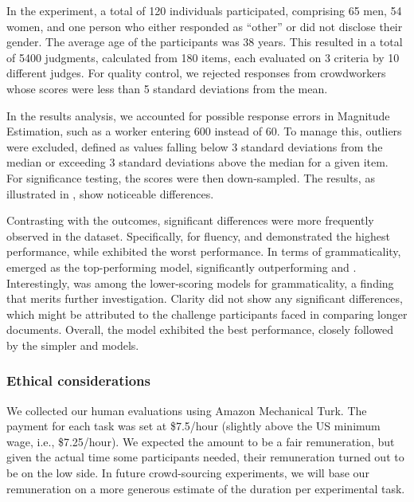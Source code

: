 In the experiment, a total of 120 individuals participated, comprising 65 men, 54 women, and one person who either responded as ``other'' or did not disclose their gender. The average age of the participants was 38 years. This resulted in a total of 5400 judgments, calculated from 180 items, each evaluated on 3 criteria by 10 different judges. For quality control, we rejected responses from crowdworkers whose scores were less than 5 standard deviations from the mean.


In the results analysis, we accounted for possible response errors in Magnitude Estimation, such as a worker entering 600 instead of 60. To manage this, outliers were excluded, defined as values falling below 3 standard deviations from the median or exceeding 3 standard deviations above the median for a given item. For significance testing, the scores were then down-sampled. The results, as illustrated in , show noticeable differences.



Contrasting with the \webnlg outcomes, significant differences were more frequently observed in the \wsj dataset. Specifically, for fluency,  and  demonstrated the highest performance, while  exhibited the worst performance. In terms of grammaticality,  emerged as the top-performing model, significantly outperforming  and . Interestingly,  was among the lower-scoring models for grammaticality, a finding that merits further investigation. Clarity did not show any significant differences, which might be attributed to the challenge participants faced in comparing longer documents. Overall, the  model exhibited the best performance, closely followed by the simpler  and  models.



\subsubsection{Ethical considerations}
We collected our human evaluations using Amazon Mechanical Turk. The payment for each task was set at \$7.5/hour (slightly above the US minimum wage, i.e., \$7.25/hour). We expected the amount to be a fair remuneration, but given the actual time some participants needed, their remuneration turned out to be on the low side. In future crowd-sourcing experiments, we will base our remuneration on a more generous estimate of the duration per experimental task.


